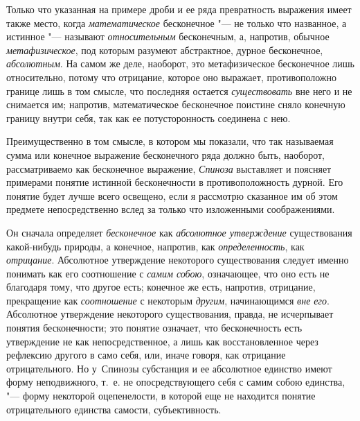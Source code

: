 Только что указанная на примере дроби и ее ряда превратность выражения имеет
также место, когда {\em математическое} бесконечное "--- не только что
названное, а истинное "--- называют {\em относительным} бесконечным, а,
напротив, обычное {\em метафизическое}, под которым разумеют абстрактное,
дурное бесконечное, {\em абсолютным}. На самом же деле, наоборот, это
метафизическое бесконечное лишь относительно, потому что отрицание, которое оно
выражает, противоположно границе лишь в том смысле, что последняя остается
{\em существовать} вне него и не снимается им; напротив, математическое
бесконечное поистине сняло конечную границу внутри себя, так как ее
потусторонность соединена с нею.\label{bkm:bm52b}

Преимущественно в том смысле, в котором мы показали, что так называемая сумма
или конечное выражение бесконечного ряда должно быть, наоборот, рассматриваемо
как бесконечное выражение, {\em Спиноза} выставляет и поясняет примерами
понятие истинной бесконечности в противоположность дурной. Его понятие будет
лучше всего освещено, если я рассмотрю сказанное им об этом предмете
непосредственно вслед за только что изложенными соображениями.

Он сначала определяет {\em бесконечное} как {\em абсолютное утверждение}
существования какой-нибудь природы, а конечное, напротив, как
{\em определенность}, как {\em отрицание}. Абсолютное утверждение некоторого
существования следует именно понимать как его соотношение с {\em самим собою},
означающее, что оно есть не благодаря тому, что другое есть; конечное же есть,
напротив, отрицание, прекращение как {\em соотношение} с некоторым
{\em другим}, начинающимся {\em вне его}. Абсолютное утверждение некоторого
существования, правда, не исчерпывает понятия бесконечности; это понятие
означает, что бесконечность есть утверждение не как непосредственное, а лишь
как восстановленное через рефлексию другого в само себя, или, иначе говоря, как
отрицание отрицательного. Но у~Спинозы субстанция и ее абсолютное единство
имеют форму неподвижного, т.~е. не опосредствующего себя с самим собою
единства, "--- форму некоторой оцепенелости, в которой еще не находится понятие
отрицательного единства самости, субъективность.

